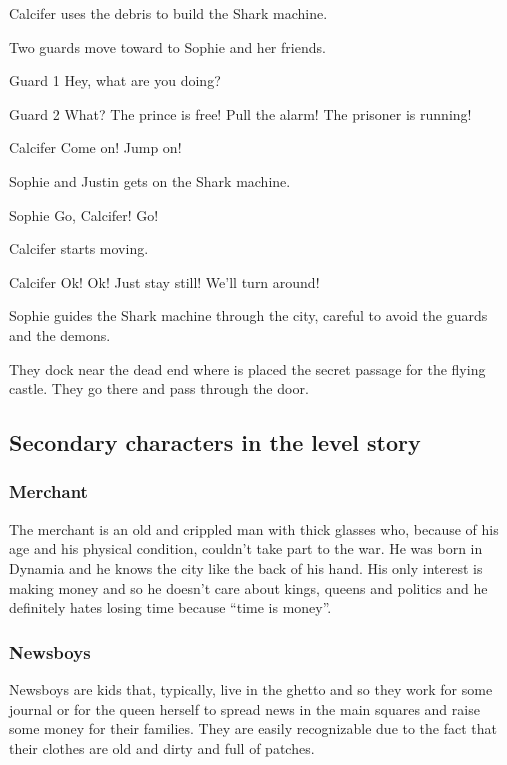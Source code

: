 Calcifer uses the debris to build the Shark machine.

\begin{screenplay}

Two guards move toward to Sophie and her friends.

\begin{dialogue}{Guard 1}
Hey, what are you doing?
\end{dialogue}

\begin{dialogue}[screaming]{Guard 2}
What? The prince is free! Pull the alarm! The prisoner is running!
\end{dialogue}

\begin{dialogue}[worried]{Calcifer}
Come on! Jump on!
\end{dialogue}

Sophie and Justin gets on the Shark machine.

\begin{dialogue}[in a hurry]{Sophie}
Go, Calcifer! Go!
\end{dialogue}

Calcifer starts moving.

\begin{dialogue}[worried]{Calcifer}
Ok! Ok! Just stay still! We'll turn around!
\end{dialogue}

\end{screenplay}
\vspace{1em}

Sophie guides the Shark machine through the city, careful to avoid the guards and the demons.

They dock near the dead end where is placed the secret passage for the flying castle. They go there and pass through the door.

\subsection{Secondary characters in the level story}
\subsubsection*{Merchant}
The merchant is an old and crippled man with thick glasses who, because of his age and his physical condition, couldn't take part to the war. He was born in Dynamia and he knows the city like the back of his hand. His only interest is making money and so he doesn't care about kings, queens and politics and he definitely hates losing time because \enquote{time is money}.

\subsubsection*{Newsboys}
Newsboys are kids that, typically, live in the ghetto and so they work for some journal or for the queen herself to spread news in the main squares and raise some money for their families. They are easily recognizable due to the fact that their clothes are old and dirty and full of patches.
